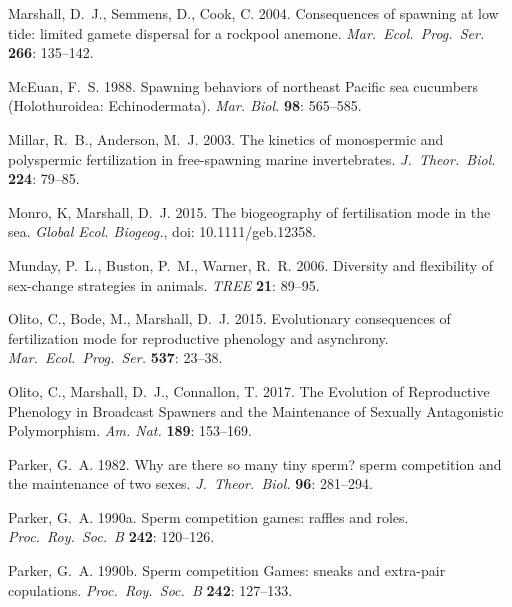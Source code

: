 \documentclass{article}
\begin{document}
\begin{thebibliography}{}
Marshall, D.~J., Semmens, D., Cook, C. 2004.
\newblock Consequences of spawning at low tide: limited gamete dispersal for a rockpool anemone.
\newblock \textit{Mar.~Ecol.~Prog.~Ser.} \textbf{266}: 135--142.

McEuan, F.~S. 1988.
\newblock Spawning behaviors of northeast Pacific sea cucumbers (Holothuroidea: Echinodermata).
\newblock \textit{Mar. Biol.} \textbf{98}: 565--585.

Millar, R.~B., Anderson, M.~J. 2003.
\newblock The kinetics of monospermic and polyspermic fertilization in free-spawning marine invertebrates.
\newblock \textit{J.~Theor.~Biol.} \textbf{224}: 79--85.

Monro, K, Marshall, D.~J. 2015.
\newblock The biogeography of fertilisation mode in the sea.
\newblock \textit{Global Ecol. Biogeog.}, doi: 10.1111/geb.12358.

Munday, P.~L., Buston, P.~M., Warner, R.~R. 2006.
\newblock Diversity and flexibility of sex-change strategies in animals.
\newblock \textit{TREE} \textbf{21}: 89--95.

Olito, C., Bode, M., Marshall, D.~J. 2015.
\newblock Evolutionary consequences of fertilization mode for reproductive phenology and asynchrony.
\newblock \textit{Mar.~Ecol.~Prog.~Ser.} \textbf{537}: 23--38.

Olito, C., Marshall, D.~J., Connallon, T. 2017.
\newblock The Evolution of Reproductive Phenology in Broadcast Spawners and the Maintenance of Sexually Antagonistic Polymorphism.
\newblock \textit{Am. Nat.} \textbf{189}: 153--169.

Parker, G.~A. 1982.
\newblock Why are there so many tiny sperm? sperm competition and the maintenance of two sexes.
\newblock \textit{J.~Theor.~Biol.} \textbf{96}: 281--294.

Parker, G.~A. 1990a.
\newblock Sperm competition games: raffles and roles.
\newblock \textit{Proc.~Roy.~Soc.~B} \textbf{242}: 120--126.

Parker, G.~A. 1990b.
\newblock Sperm competition Games: sneaks and extra-pair copulations.
\newblock \textit{Proc.~Roy.~Soc.~B} \textbf{242}: 127--133.


\end{thebibliography}
\end{document}
